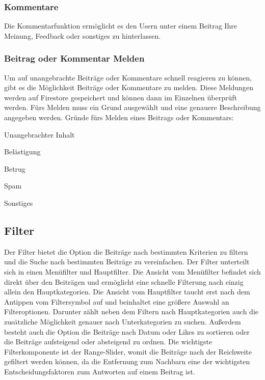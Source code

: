 \subsubsection{Kommentare}
Die Kommentarfunktion ermöglicht es den Usern unter einem Beitrag Ihre Meinung, Feedback oder sonstiges zu hinterlassen.

\subsubsection{Beitrag oder Kommentar Melden}
Um auf unangebrachte Beiträge oder Kommentare schnell reagieren zu können, gibt es die Möglichkeit Beiträge oder Kommentare zu melden. Diese Meldungen werden auf Firestore gespeichert und können dann im Einzelnen überprüft werden. Fürs Melden muss ein Grund ausgewählt und eine genauere Beschreibung angegeben werden.
Gründe fürs Melden eines Beitrags oder Kommentars:

\begin{compactitem}
  \item Unangebrachter Inhalt
  \item Belästigung
  \item Betrug
  \item Spam
  \item Sonstiges
\end{compactitem}

\subsection{Filter}
Der Filter bietet die Option die Beiträge nach bestimmten Kriterien zu filtern und die Suche nach bestimmten Beiträge zu vereinfachen. Der Filter unterteilt sich in einen Menüfilter und Hauptfilter.
Die Ansicht vom Menüfilter befindet sich direkt über den Beiträgen und ermöglicht eine schnelle Filterung nach einzig allein den Hauptkategorien.
Die Ansicht vom Hauptfilter taucht erst nach dem Antippen vom Filtersymbol auf und beinhaltet eine größere Auswahl an Filteroptionen. Darunter zählt neben dem Filtern nach Hauptkategorien auch die zusätzliche Möglichkeit genauer nach Unterkategorien zu suchen. Außerdem besteht auch die Option die Beiträge nach Datum oder Likes zu sortieren oder die Beiträge aufsteigend oder absteigend zu ordnen. Die wichtigste Filterkomponente ist der Range-Slider, womit die Beiträge nach der Reichweite gefiltert werden können, da die Entfernung zum Nachbarn eine der wichtigsten Entscheidungsfaktoren zum Antworten auf einem Beitrag ist.

